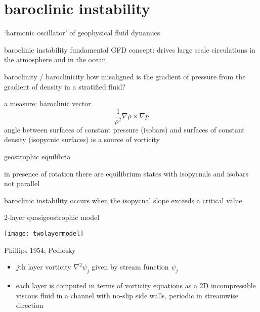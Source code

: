 
\section[baroclinic instability]{baroclinic instability}

\begin{frame}{`harmonic oscillator' of geophysical fluid dynamics}
\begin{block}{baroclinic instability}
 fundamental GFD concept: drives
large scale circulations in the atmosphere and in
the ocean
\end{block}

\bigskip

\begin{block}{baroclinity / baroclinicity}
how
misaligned is the gradient of pressure from the gradient of density in a
 stratified fluid?
\bigskip

a measure: baroclinic vector
\[
\frac{1}{\rho^2} \nabla \rho \times \nabla p
\] %
angle between surfaces of
constant pressure (isobars) and surfaces of constant density
(isopycnic surfaces) is a source of vorticity
\end{block}

\end{frame}

\begin{frame}{geostrophic equilibria}
\begin{block}{in presence of rotation}
there are equilibrium states with isopycnals and isobars not parallel
\end{block}

\begin{block}{baroclinic instability}
occurs when the isopycnal slope exceeds a critical value
\end{block}
\end{frame}

\begin{frame}{2-layer quasigeostrophic model}
\begin{block}{}
\begin{center}
    \texttt{[image: twolayermodel]}
\end{center}
\end{block}

\begin{block}{Phillips 1954; Pedlosky}
\begin{itemize}
  \item
$j$th layer vorticity
$\nabla^2 \psi_j$ given by stream function $\psi_j$
  \item  each layer is computed in terms of vorticity equations as a 2D
incompressible viscous fluid in a channel with no-slip side walls,
periodic in streamwise direction
\end{itemize}

\end{block}
\end{frame}

